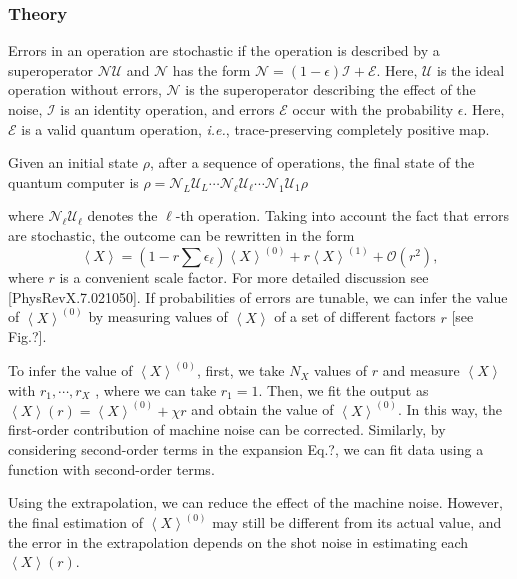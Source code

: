 \documentclass[11pt, oneside]{article}   	%
\begin{document}
\subsubsection{Theory}
Errors in an operation are stochastic if the operation is described by a superoperator $\mathcal{N} \mathcal{U}$ and $\mathcal{N}$ has the form 
$\mathcal{N} = (1 - \epsilon) \mathcal{I} + \mathcal{E}$. 
Here, $\mathcal{U}$ is the ideal operation without errors, $\mathcal{N}$ is the superoperator describing the effect of the noise, $\mathcal{I}$ is an identity operation, and errors $\mathcal{E}$ occur with the probability $\epsilon$. 
Here, $\mathcal{E}$ is a valid quantum operation, \textit{i.e.}, trace-preserving completely positive map.

Given an initial state $\rho$, after a sequence of operations, the final state of the quantum computer is
$\rho = \mathcal{N}_L \mathcal{U}_L \cdots \mathcal{N}_{\ell} \mathcal{U}_{\ell} \cdots \mathcal{N}_1 \mathcal{U}_1 \rho$

where $\mathcal{N}_{\ell} \mathcal{U}_{\ell}$ denotes the $\ell$-th operation. 
Taking into account the fact that errors are stochastic, the outcome can be rewritten in the form
\begin{equation}
\left< X \right> = \left(1 - r \sum \epsilon_{\ell} \right) \left< X \right>^{(0)} + r  \left< X \right>^{(1)} + \mathcal{O}(r^2),
\end{equation}
where $r$ is a convenient scale factor. 
For more detailed discussion see [PhysRevX.7.021050].
If probabilities of errors are tunable, we can infer the value of $\left< X \right>^{(0)}$ by measuring values of $\left< X \right>$ of a set of
different factors $r$ [see Fig.?]. 

To infer the value of $\left< X \right>^{(0)}$, first, we take $N_X$ values of $r$ and measure $\left< X \right>$ with $r_1, \cdots, r_X$ , where
we can take $r_1 = 1$. 
Then, we fit the output as $\left< X \right> (r) = \left< X \right>^{(0)} + \chi r$ and obtain the value of $\left< X \right>^{(0)}$.
In this way, the first-order contribution of machine noise can be corrected. 
Similarly, by considering second-order terms in the expansion Eq.?, we can fit data using a function with second-order terms.

Using the extrapolation, we can reduce the effect of the machine noise. 
However, the final estimation of $\left< X \right>^{(0)}$ may still be different from its actual value, and the error in the extrapolation depends on the shot noise in estimating each $\left< X \right> (r)$.
\end{document}
